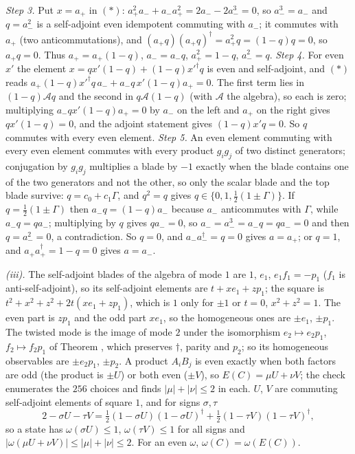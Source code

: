 \emph{Step 3.} Put $x = a_{+}$ in $(*)$: $a_{+}^{2}a_{-} + a_{-}a_{+}^{2} = 2a_{-} - 2a_{-}^{3} = 0$, so $a_{-}^{3} = a_{-}$ and $q = a_{-}^{2}$ is a self-adjoint even idempotent commuting with $a_{-}$; it commutes with $a_{+}$ (two anticommutations), and $(a_{+}q)(a_{+}q)^{\dagger} = a_{+}^{2}q = (1 - q)q = 0$, so $a_{+}q = 0$. Thus $a_{+} = a_{+}(1 - q)$, $a_{-} = a_{-}q$, $a_{+}^{2} = 1 - q$, $a_{-}^{2} = q$. \emph{Step 4.} For even $x'$ the element $x = qx'(1 - q) + (1 - q)x'^{\dagger}q$ is even and self-adjoint, and $(*)$ reads $a_{+}(1 - q)x'^{\dagger}q\,a_{-} + a_{-}q\,x'(1 - q)a_{+} = 0$. The first term lies in $(1 - q)\mathcal{A}q$ and the second in $q\mathcal{A}(1 - q)$ (with $\mathcal{A}$ the algebra), so each is zero; multiplying $a_{-}qx'(1 - q)a_{+} = 0$ by $a_{-}$ on the left and $a_{+}$ on the right gives $qx'(1 - q) = 0$, and the adjoint statement gives $(1 - q)x'q = 0$. So $q$ commutes with every even element. \emph{Step 5.} An even element commuting with every even element commutes with every product $g_{i}g_{j}$ of two distinct generators; conjugation by $g_{i}g_{j}$ multiplies a blade by $-1$ exactly when the blade contains one of the two generators and not the other, so only the scalar blade and the top blade survive: $q = c_{0} + c_{1}\Gamma$, and $q^{2} = q$ gives $q \in \{0, 1, \tfrac12(1 \pm \Gamma)\}$. If $q = \tfrac12(1 \pm \Gamma)$ then $a_{-}q = (1 - q)a_{-}$ because $a_{-}$ anticommutes with $\Gamma$, while $a_{-}q = qa_{-}$; multiplying by $q$ gives $qa_{-} = 0$, so $a_{-} = a_{-}^{3} = a_{-}q = qa_{-} = 0$ and then $q = a_{-}^{2} = 0$, a contradiction. So $q = 0$, and $a_{-}a_{-}^{\dagger} = q = 0$ gives $a = a_{+}$; or $q = 1$, and $a_{+}a_{+}^{\dagger} = 1 - q = 0$ gives $a = a_{-}$.

\emph{(iii).} The self-adjoint blades of the algebra of mode $1$ are $1$, $e_{1}$, $e_{1}f_{1} = -p_{1}$ ($f_{1}$ is anti-self-adjoint), so its self-adjoint elements are $t + xe_{1} + zp_{1}$; the square is $t^{2} + x^{2} + z^{2} + 2t(xe_{1} + zp_{1})$, which is $1$ only for $\pm 1$ or $t = 0$, $x^{2} + z^{2} = 1$. The even part is $zp_{1}$ and the odd part $xe_{1}$, so the homogeneous ones are $\pm e_{1}$, $\pm p_{1}$. The twisted mode is the image of mode $2$ under the isomorphism $e_{2} \mapsto e_{2}p_{1}$, $f_{2} \mapsto f_{2}p_{1}$ of Theorem , which preserves $\dagger$, parity and $p_{2}$; so its homogeneous observables are $\pm e_{2}p_{1}$, $\pm p_{2}$. A product $A_{i}B_{j}$ is even exactly when both factors are odd (the product is $\pm U$) or both even ($\pm V$), so $E(C) = \mu U + \nu V$; the check enumerates the $256$ choices and finds $|\mu| + |\nu| \le 2$ in each. $U$, $V$ are commuting self-adjoint elements of square $1$, and for signs $\sigma, \tau$
\[
2 - \sigma U - \tau V = \tfrac12(1 - \sigma U)(1 - \sigma U)^{\dagger} + \tfrac12(1 - \tau V)(1 - \tau V)^{\dagger} ,
\]
so a state has $\omega(\sigma U) \le 1$, $\omega(\tau V) \le 1$ for all signs and $|\omega(\mu U + \nu V)| \le |\mu| + |\nu| \le 2$. For an even $\omega$, $\omega(C) = \omega(E(C))$.

